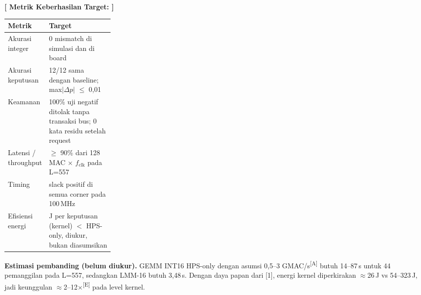 \documentclass[10pt]{article}
\newcommand{\hd}[1]{\cellcolor{thg}\textbf{#1}}
\newcommand{\lbl}[1]{\textbf{#1}\par}
\newcommand{\E}{\textsuperscript{[E]}}
\newcommand{\A}{\textsuperscript{[A]}}
\begin{document}
\lbl{[ Metrik Keberhasilan Target: ]}

{\small
\begin{tabularx}{\linewidth}{|p{0.25\linewidth}|L|}
\hline
\hd{Metrik} & \hd{Target} \\ \hline
Akurasi integer & 0 mismatch di simulasi dan di board \\ \hline
Akurasi keputusan & 12/12 sama dengan baseline; max$|\Delta p|$ $\le$ 0,01 \\ \hline
Keamanan & 100\% uji negatif ditolak tanpa transaksi bus; 0 kata residu setelah request \\ \hline
Latensi / throughput & $\ge$ 90\% dari 128 MAC $\times$ $f_\mathrm{clk}$ pada L=557 \\ \hline
Timing & slack positif di semua corner pada 100\,MHz \\ \hline
Efisiensi energi & J per keputusan (kernel) $<$ HPS-only, diukur, bukan diasumsikan \\ \hline
\end{tabularx}}

\textbf{Estimasi pembanding (belum diukur).} GEMM INT16 HPS-only dengan asumsi 0,5--3 GMAC/s\A{} butuh 14--87\,s untuk 44 pemanggilan pada L=557, sedangkan LMM-16 butuh 3,48\,s. Dengan daya papan dari [1], energi kernel diperkirakan $\approx$26\,J vs 54--323\,J, jadi keunggulan $\approx$2--12$\times$\E{} pada level kernel.

\end{document}
